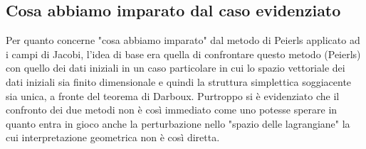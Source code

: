 \documentclass[Main]{subfiles}
\begin{document}
		\subsection{Cosa abbiamo imparato dal caso evidenziato}
		Per quanto concerne "cosa abbiamo imparato" dal metodo di Peierls applicato ad i campi di Jacobi, l'idea di base era quella di confrontare questo metodo (Peierls) con quello dei dati iniziali in un caso particolare in cui lo spazio vettoriale dei dati iniziali sia finito dimensionale e quindi la struttura simplettica soggiacente sia unica, a fronte del teorema di Darboux. 
		Purtroppo si è evidenziato che il confronto dei due metodi non è così immediato come uno potesse sperare in quanto entra in gioco anche la perturbazione nello "spazio delle lagrangiane" la cui interpretazione geometrica non è così diretta. 
\end{document}

